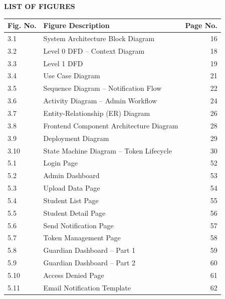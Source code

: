 \documentclass[12pt,a4paper]{report}
\begin{document}
\newpage
\begin{center}{\fontsize{16pt}{18pt}\selectfont\textbf{LIST OF FIGURES}}\end{center}
\begin{table}[H]
\renewcommand{\arraystretch}{1.3}
\centering
{\fontsize{12pt}{14pt}\selectfont
\begin{tabular*}{\textwidth}{@{\extracolsep{\fill}} l >{\raggedright\arraybackslash}p{9cm} r}
\toprule
\textbf{Fig. No.} & \textbf{Figure Description} & \textbf{Page No.}\\
\midrule
3.1 & System Architecture Block Diagram & 16\\
3.2 & Level 0 DFD -- Context Diagram & 18\\
3.3 & Level 1 DFD & 19\\
3.4 & Use Case Diagram & 21\\
3.5 & Sequence Diagram -- Notification Flow & 22\\
3.6 & Activity Diagram -- Admin Workflow & 24\\
3.7 & Entity-Relationship (ER) Diagram & 26\\
3.8 & Frontend Component Architecture Diagram & 28\\
3.9 & Deployment Diagram & 29\\
3.10 & State Machine Diagram -- Token Lifecycle & 30\\
5.1 & Login Page & 52\\
5.2 & Admin Dashboard & 53\\
5.3 & Upload Data Page & 54\\
5.4 & Student List Page & 55\\
5.5 & Student Detail Page & 56\\
5.6 & Send Notification Page & 57\\
5.7 & Token Management Page & 58\\
5.8 & Guardian Dashboard -- Part 1 & 59\\
5.9 & Guardian Dashboard -- Part 2 & 60\\
5.10 & Access Denied Page & 61\\
5.11 & Email Notification Template & 62\\
\bottomrule
\end{tabular*}}
\end{table}
\end{document}
